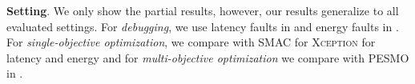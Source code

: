 

%
%




% 

\noindent \textbf{Setting}. We only show the partial results, however, our results generalize to all evaluated settings. For \emph{debugging}, we use latency faults in \txtwo and energy faults in \xavier. For \emph{single-objective optimization}, we compare \ourapproach with SMAC for \textsc{Xception} for latency and energy and for \emph{multi-objective optimization} we compare with PESMO in \txtwo. %


   
